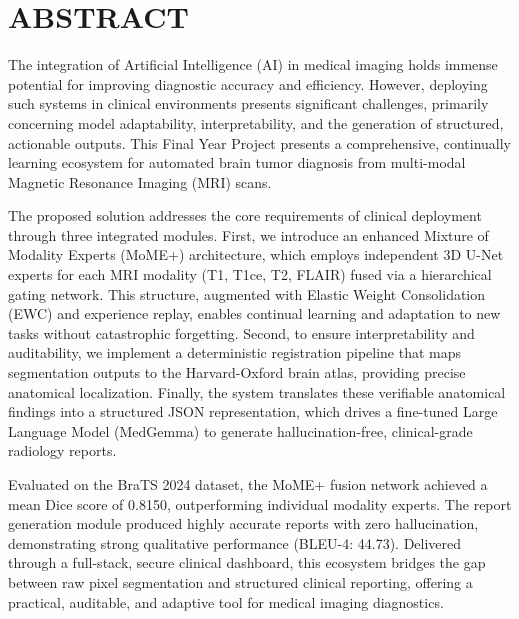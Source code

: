\documentclass[12pt, a4paper]{report}
\begin{document}
\clearpage

\tableofcontents
\clearpage
\listoffigures
{}
\clearpage
\listoftables
{}
\clearpage

\chapter*{ABSTRACT}
The integration of Artificial Intelligence (AI) in medical imaging holds immense potential for improving diagnostic accuracy and efficiency. However, deploying such systems in clinical environments presents significant challenges, primarily concerning model adaptability, interpretability, and the generation of structured, actionable outputs. This Final Year Project presents a comprehensive, continually learning ecosystem for automated brain tumor diagnosis from multi-modal Magnetic Resonance Imaging (MRI) scans. 

The proposed solution addresses the core requirements of clinical deployment through three integrated modules. First, we introduce an enhanced Mixture of Modality Experts (MoME+) architecture, which employs independent 3D U-Net experts for each MRI modality (T1, T1ce, T2, FLAIR) fused via a hierarchical gating network. This structure, augmented with Elastic Weight Consolidation (EWC) and experience replay, enables continual learning and adaptation to new tasks without catastrophic forgetting. Second, to ensure interpretability and auditability, we implement a deterministic registration pipeline that maps segmentation outputs to the Harvard-Oxford brain atlas, providing precise anatomical localization. Finally, the system translates these verifiable anatomical findings into a structured JSON representation, which drives a fine-tuned Large Language Model (MedGemma) to generate hallucination-free, clinical-grade radiology reports. 

Evaluated on the BraTS 2024 dataset, the MoME+ fusion network achieved a mean Dice score of 0.8150, outperforming individual modality experts. The report generation module produced highly accurate reports with zero hallucination, demonstrating strong qualitative performance (BLEU-4: 44.73). Delivered through a full-stack, secure clinical dashboard, this ecosystem bridges the gap between raw pixel segmentation and structured clinical reporting, offering a practical, auditable, and adaptive tool for medical imaging diagnostics.
\end{document}
